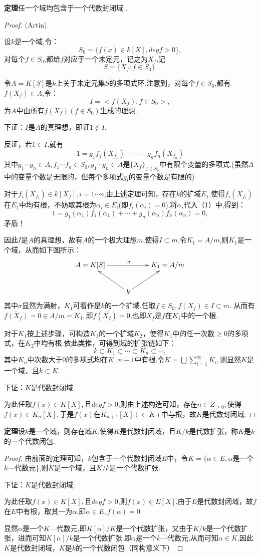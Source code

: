 \documentclass[UTF8]{article}
\begin{document}
\textbf{定理}\quad 任一个域均包含于一个代数封闭域 .
\begin{proof}
(Artin)

设$k$是一个域,令：
$$S_0=\{f(x)\in k[X],degf>0\},$$对每个$f\in S_0$,都给$f$对应于一个未定元，记之为$X_f$,记$$S=\{X_f:f\in S_0\}.$$

令$A=K[S]$是$k$上关于未定元集$S$的多项式环.注意到，对每个$f\in S_0$,都有$f(X_f)\in A$,令：$$I=<f(X_f):f\in S_0>,$$为$A$中由所有$f(X_f)(f\in S_0)$生成的理想.

下证：$I$是$A$的真理想，即证$1\notin I,$

反证，若$1\in I$,就有
\begin{equation}
1=g_1f_1(X_{f_1})+\cdots+g_nf_n(X_{f_n})
\end{equation}
其中$g_1\cdots g_n\in A,f_1\cdots f_n\in S_0,g_1\cdots g_n\in A$是$\{X_f\}_{f\in S_0}$中有限个变量的多项式.(虽然$A$中的变量个数是无限的，但每个多项式$g_i$的变量个数是有限的)

对于$f_i(X_{f_i})\in k[X_f],i=1\cdots n$,由上述定理可知，存在$k$的扩域$E_1$,使得$f_i(X_{f_i})$在$E_1$中均有根，不妨取其根为$\alpha_i\in E$,(即$f_i(\alpha_i)=0$),将$\alpha_i$代入（1）中,得到：$$1=g_1(\alpha_1)f_1(\alpha_1)+\cdots+g_n(\alpha_n)f_n(\alpha_n)=0,$$矛盾！

因此$I$是$A$的真理想，故有$A$的一个极大理想$m$,使得$I\subset m$.令$K_1=A/m$,则$K_1$是一个域，从而如下图所示：$$\xymatrix{A=K[S]\ar[rr]^{\sigma }&&{K_1=A/m}\\& k\ar[lu] \ar[ru] & }$$其中$\sigma $显然为满射，$K_1$可看作是$k$的一个扩域.任取$f\in S_0,f(X_f)\in I\subset m.$ 从而有$\overline{f(X_f)}=\overline{0}\in A/m=K_1,$即$f(\overline{X_f})=\overline{0}$,也即$\overline{X_f}$是$f$在$K_1$中的一个根.

对于$K_1$按上述步骤，可构造$K_1$的一个扩域$K_2$，使得$K_1$中的任一次数$\ge0$的多项式，在$K_2$中均有根.依此类推，可得到域的扩张链如下：$$k\subset K_1\subset\cdots\subset K_n\subset\cdots, $$其中$ K_n$中次数大于0的多项式均在$ K_-{n-1}$中有根.令$K=\bigcup\sum_{i=1}^\infty K_i,$则显然$K$是一个域，且$k\subset K$.

下证：$K$是代数封闭域.

为此任取$f(x)\in K[X],$且$degf>0$,则由上述构造可知，存在$n\in Z_{\ge0},$使得$f(x)\in K_n[X],$于是$f(x)$在$K_{n+1}[X](\subset K)$中与根，故$K$是代数封闭域.
\end{proof}

\textbf{定理}\quad 设$k$是一个域，则存在域$K$,使得$K$是代数封闭域，且$K/k$是代数扩张，称$K$是$k$的一个代数闭包.
\begin{proof}
由前面的定理可知，$k$包含于一个代数封闭域$E$中，令$K=\{\alpha \in E,\alpha$是一个$k$—代数元\},则$K$是一个域，且$K/k$是一个代数扩张.

下证：$K$是代数封闭域.

为此任取$f(x)\in K[X],$且$degf>0$,则$f(x)\in E[X]$,由于$E$是代数封闭域，故$f$在$E$中有根，取其一为$\alpha$,即$\alpha\in E,f(\alpha)=0$

显然$\alpha$是一个$K$—代数元,即$K[\alpha]/K$是一个代数扩张，又由于$K/k$是一个代数扩张，进而可知$K[\alpha]/k$是一个代数扩张.即$\alpha$是一个$k$—代数元,从而可知$\alpha\in K$,因此$K$是代数封闭域，$K$是$k$的一个代数闭包（同构意义下）
\end{proof}
\end{document}
